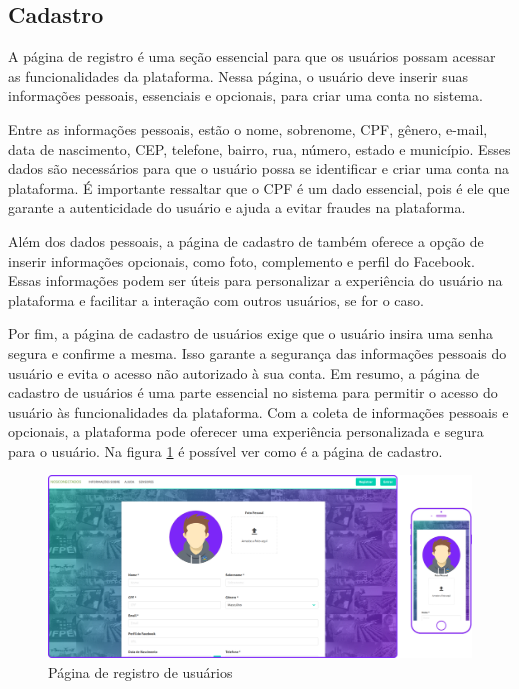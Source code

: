 \documentclass[tcc,capa]{texufpel}
\begin{document}
\subsection{Cadastro}
A página de registro é uma seção essencial para que os usuários possam acessar as funcionalidades da plataforma. Nessa página, o usuário deve inserir suas informações pessoais, essenciais e opcionais, para criar uma conta no sistema.

Entre as informações pessoais, estão o nome, sobrenome, CPF, gênero, e-mail, data de nascimento, CEP, telefone, bairro, rua, número, estado e município. Esses dados são necessários para que o usuário possa se identificar e criar uma conta na plataforma. É importante ressaltar que o CPF é um dado essencial, pois é ele que garante a autenticidade do usuário e ajuda a evitar fraudes na plataforma.

Além dos dados pessoais, a página de cadastro de também oferece a opção de inserir informações opcionais, como foto, complemento e perfil do Facebook. Essas informações podem ser úteis para personalizar a experiência do usuário na plataforma e facilitar a interação com outros usuários, se for o caso.

Por fim, a página de cadastro de usuários exige que o usuário insira uma senha segura e confirme a mesma. Isso garante a segurança das informações pessoais do usuário e evita o acesso não autorizado à sua conta. Em resumo, a página de cadastro de usuários é uma parte essencial no sistema para permitir o acesso do usuário às funcionalidades da plataforma. Com a coleta de informações pessoais e opcionais, a plataforma pode oferecer uma experiência personalizada e segura para o usuário. Na figura \ref{cadastro} é possível ver como é a página de cadastro.
\begin{figure}[htbp]
  \centering \includegraphics[scale=.2]{assets/cadastro.png}
  \caption{Página de registro de usuários}
  \label{cadastro}
\end{figure}
\newpage
\end{document}
